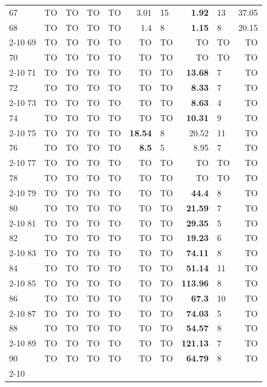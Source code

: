\begin{longtable}{lr@{\hskip 4pt}l@{\hskip 12pt}r@{\hskip 4pt}l@{\hskip 12pt}r@{\hskip 4pt}l@{\hskip 12pt}r@{\hskip 4pt}l@{\hskip 12pt}r}
67 & TO & TO & TO & TO & 3.01 & 15 & \textbf{1.92} & 13 & 37.05 \\
68 & TO & TO & TO & TO & 1.4 & 8 & \textbf{1.15} & 8 & 20.15 \\
\cmidrule{2-10}
69 & TO & TO & TO & TO & TO & TO & TO & TO & TO \\
70 & TO & TO & TO & TO & TO & TO & TO & TO & TO \\
\cmidrule{2-10}
71 & TO & TO & TO & TO & TO & TO & \textbf{13.68} & 7 & TO \\
72 & TO & TO & TO & TO & TO & TO & \textbf{8.33} & 7 & TO \\
\cmidrule{2-10}
73 & TO & TO & TO & TO & TO & TO & \textbf{8.63} & 4 & TO \\
74 & TO & TO & TO & TO & TO & TO & \textbf{10.31} & 9 & TO \\
\cmidrule{2-10}
75 & TO & TO & TO & TO & \textbf{18.54} & 8 & 20.52 & 11 & TO \\
76 & TO & TO & TO & TO & \textbf{8.5} & 5 & 8.95 & 7 & TO \\
\cmidrule{2-10}
77 & TO & TO & TO & TO & TO & TO & TO & TO & TO \\
78 & TO & TO & TO & TO & TO & TO & TO & TO & TO \\
\cmidrule{2-10}
79 & TO & TO & TO & TO & TO & TO & \textbf{44.4} & 8 & TO \\
80 & TO & TO & TO & TO & TO & TO & \textbf{21.59} & 7 & TO \\
\cmidrule{2-10}
81 & TO & TO & TO & TO & TO & TO & \textbf{29.35} & 5 & TO \\
82 & TO & TO & TO & TO & TO & TO & \textbf{19.23} & 6 & TO \\
\cmidrule{2-10}
83 & TO & TO & TO & TO & TO & TO & \textbf{74.11} & 8 & TO \\
84 & TO & TO & TO & TO & TO & TO & \textbf{51.14} & 11 & TO \\
\cmidrule{2-10}
85 & TO & TO & TO & TO & TO & TO & \textbf{113.96} & 8 & TO \\
86 & TO & TO & TO & TO & TO & TO & \textbf{67.3} & 10 & TO \\
\cmidrule{2-10}
87 & TO & TO & TO & TO & TO & TO & \textbf{74.03} & 5 & TO \\
88 & TO & TO & TO & TO & TO & TO & \textbf{54.57} & 8 & TO \\
\cmidrule{2-10}
89 & TO & TO & TO & TO & TO & TO & \textbf{121.13} & 7 & TO \\
90 & TO & TO & TO & TO & TO & TO & \textbf{64.79} & 8 & TO \\
\cmidrule{2-10}

\end{longtable}

